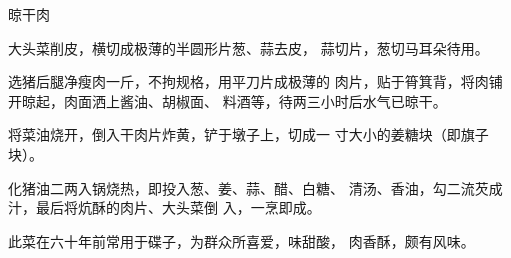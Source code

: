 \begin{recipe}{晾干肉}

\ingredients



\cooking

\step 大头菜削皮，横切成极薄的半圆形片葱、蒜去皮， 蒜切片，葱切马耳朵待用。

选猪后腿净瘦肉一斤，不拘规格，用平刀片成极薄的 肉片，贴于筲箕背，将肉铺开晾起，肉面洒上酱油、胡椒面、 料酒等，待两三小时后水气已晾干。

\step 将菜油烧开，倒入干肉片炸黄，铲于墩子上，切成一 寸大小的姜糖块（即旗子块）。

\step 化猪油二两入锅烧热，即投入葱、姜、蒜、醋、白糖、 清汤、香油，勾二流芡成汁，最后将炕酥的肉片、大头菜倒 入，一烹即成。

\notes

此菜在六十年前常用于碟子，为群众所喜爱，味甜酸， 肉香酥，颇有风味。

\end{recipe}

